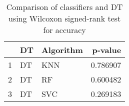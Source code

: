 \begin{table}
\footnotesize
\caption{Comparison of classifiers and DT using Wilcoxon signed-rank test for accuracy}
\label{tab:DT wilcoxon ACC comparison}
\begin{tabular}{lllr}
\hline
 & DT & Algorithm & p-value \\
\hline
1 & DT & KNN & 0.786907 \\
2 & DT & RF & 0.600482 \\
3 & DT & SVC & 0.269183 \\
\hline
\end{tabular}
\end{table}
